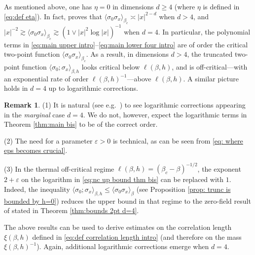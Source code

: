 \documentclass[11pt,a4paper]{article}
\numberwithin{equation}{section}
\theoremstyle{plain}
\theoremstyle{definition}
\newtheorem{Rem}[Thm]{Remark}
\begin{document}
As mentioned above, one has $\eta=0$ in dimensions $d\geq 4$ (where $\eta$ is defined in \eqref{eq:def eta}). In fact, \cite{DuminilPanis2024newLB} proves that $\langle \sigma_0\sigma_x\rangle_{\beta_c}\asymp |x|^{2-d}$ when $d>4$, and $|x|^{-2}\gtrsim \langle \sigma_0\sigma_x\rangle_{\beta_c}\gtrsim (1\vee |x|^2\log |x|)^{-1}$ when $d=4$. In particular, the polynomial terms in \eqref{eq:main upper intro}--\eqref{eq:main lower four intro} are of order the critical two-point function $\langle \sigma_0\sigma_x\rangle_{\beta_c}$. As a result, in dimensions $d>4$, the truncated two-point function $\langle \sigma_0;\sigma_x\rangle_{\beta,h}$ looks critical below $\ell(\beta,h)$, and is off-critical---with an exponential rate of order $\ell(\beta,h)^{-1}$---above $\ell(\beta,h)$. A similar picture holds in $d=4$ up to logarithmic corrections.
\begin{Rem}\hspace{-1pt}(1) It is natural (see e.g.~\cite{BauerschmidtBrydgesSlade2014Phi4fourdim,bauerschmidt2017finite}) to see logarithmic corrections appearing in the \emph{marginal} case $d=4$. We do not, however, expect the logarithmic terms in Theorem
\ref{thm:main bis} to be of the correct order. 

(2) The need for a parameter $\varepsilon>0$ is technical, as can be seen from \eqref{eq: where eps becomes crucial}.

(3)  In the thermal off-critical regime
$\ell(\beta,h)=(\beta_c-\beta)^{-1/2}$, the exponent $2+\varepsilon$ on the logarithm in
\eqref{eq:nc up bound thm bis} can be replaced with $1$.  Indeed, the inequality
    $\langle\sigma_0;\sigma_x\rangle_{\beta,h}
    \leq\langle\sigma_0\sigma_x\rangle_{\beta}$
(see Proposition \ref{prop: trunc is bounded by h=0}) reduces the upper bound in that regime to the zero-field result of
\cite{DuminilPanis2024newLB} stated in Theorem
\ref{thm:bounds 2pt d=4}.	
\end{Rem}


The above results can be used to derive estimates on the correlation length $\xi(\beta,h)$ defined in \eqref{eq:def correlation length intro} (and therefore on the mass $\xi(\beta,h)^{-1}$). Again, additional logarithmic corrections emerge when $d=4$.
\end{document}
